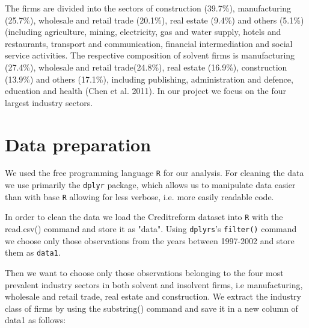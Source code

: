 \documentclass{article}
\begin{document}

The firms are divided into the sectors of construction (39.7\%), manufacturing (25.7\%), wholesale and retail trade (20.1\%), real estate (9.4\%) and others (5.1\%) (including agriculture, mining, electricity, gas and water supply, hotels and restaurants, transport and communication, financial intermediation and social service activities. The respective composition of solvent firms is manufacturing (27.4\%), wholesale and retail trade(24.8\%), real estate (16.9\%), construction (13.9\%) and others (17.1\%), including publishing, administration and defence, education and health (Chen et al. 2011). In our project we focus on the four largest industry sectors.

\section{Data preparation}

We used the free programming language \texttt{R} for our analysis. For cleaning the data we use primarily the \texttt{dplyr} package, which allows us to manipulate data easier than with base \texttt{R} allowing for less verbose, i.e. more easily readable code. 

In order to clean the data we load the Creditreform dataset into \texttt{R} with the read.csv() command and store it as "data". Using \texttt{dplyrs}'s \texttt{filter()} command we choose only those observations from the years between 1997-2002 and store them as \texttt{data1}.



Then we want to choose only those observations belonging to the four most prevalent industry sectors in both solvent and insolvent firms, i.e manufacturing, wholesale and retail trade, real estate and construction. We extract the industry class of firms by using the substring() command and save it in a new column of data1 as follows:
\end{document}

